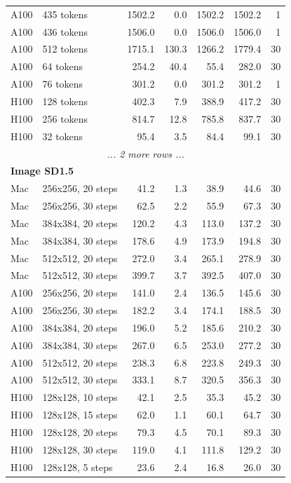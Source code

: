 \documentclass[11pt]{article}
\begin{document}
\begin{longtable}{llrrrrr}
A100 & 435 tokens & 1502.2 & 0.0 & 1502.2 & 1502.2 & 1 \\
A100 & 436 tokens & 1506.0 & 0.0 & 1506.0 & 1506.0 & 1 \\
A100 & 512 tokens & 1715.1 & 130.3 & 1266.2 & 1779.4 & 30 \\
A100 & 64 tokens & 254.2 & 40.4 & 55.4 & 282.0 & 30 \\
A100 & 76 tokens & 301.2 & 0.0 & 301.2 & 301.2 & 1 \\
H100 & 128 tokens & 402.3 & 7.9 & 388.9 & 417.2 & 30 \\
H100 & 256 tokens & 814.7 & 12.8 & 785.8 & 837.7 & 30 \\
H100 & 32 tokens & 95.4 & 3.5 & 84.4 & 99.1 & 30 \\
\multicolumn{8}{c}{\textit{... 2 more rows ...}} \\
\midrule
\multicolumn{8}{l}{\textbf{Image SD1.5}} \\
\midrule
Mac & 256x256, 20 steps & 41.2 & 1.3 & 38.9 & 44.6 & 30 \\
Mac & 256x256, 30 steps & 62.5 & 2.2 & 55.9 & 67.3 & 30 \\
Mac & 384x384, 20 steps & 120.2 & 4.3 & 113.0 & 137.2 & 30 \\
Mac & 384x384, 30 steps & 178.6 & 4.9 & 173.9 & 194.8 & 30 \\
Mac & 512x512, 20 steps & 272.0 & 3.4 & 265.1 & 278.9 & 30 \\
Mac & 512x512, 30 steps & 399.7 & 3.7 & 392.5 & 407.0 & 30 \\
A100 & 256x256, 20 steps & 141.0 & 2.4 & 136.5 & 145.6 & 30 \\
A100 & 256x256, 30 steps & 182.2 & 3.4 & 174.1 & 188.5 & 30 \\
A100 & 384x384, 20 steps & 196.0 & 5.2 & 185.6 & 210.2 & 30 \\
A100 & 384x384, 30 steps & 267.0 & 6.5 & 253.0 & 277.2 & 30 \\
A100 & 512x512, 20 steps & 238.3 & 6.8 & 223.8 & 249.3 & 30 \\
A100 & 512x512, 30 steps & 333.1 & 8.7 & 320.5 & 356.3 & 30 \\
H100 & 128x128, 10 steps & 42.1 & 2.5 & 35.3 & 45.2 & 30 \\
H100 & 128x128, 15 steps & 62.0 & 1.1 & 60.1 & 64.7 & 30 \\
H100 & 128x128, 20 steps & 79.3 & 4.5 & 70.1 & 89.3 & 30 \\
H100 & 128x128, 30 steps & 119.0 & 4.1 & 111.8 & 129.2 & 30 \\
H100 & 128x128, 5 steps & 23.6 & 2.4 & 16.8 & 26.0 & 30 \\

\end{longtable}
\end{document}
